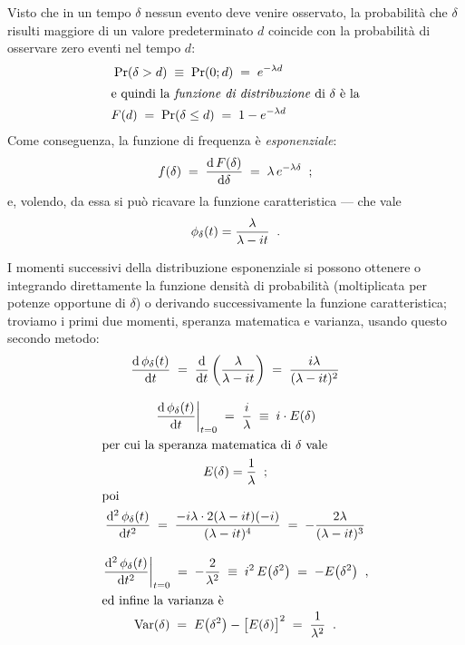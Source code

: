 Visto che in un tempo $\delta$ nessun evento deve venire
osservato, la probabilit\`a che $\delta$ risulti maggiore di
un valore predeterminato $d$ coincide con la probabilit\`a
di osservare zero eventi nel tempo $d$:
\begin{gather*}
  \Pr (\delta > d) \; \equiv \; \Pr (0;d) \; = \; e^{-
    \lambda d} \\
  \intertext{e quindi la \emph{funzione di distribuzione} di
    $\delta$ \`e la}
  F(d) \; = \; \Pr (\delta \le d) \; = \; 1 - e^{- \lambda
    d}
\end{gather*}
Come conseguenza, la funzione di frequenza \`e
\emph{esponenziale}:
\begin{equation} \label{eq:8.expon}
  f(\delta) \; = \; \frac{\mathrm{d} \, F(\delta)}{\mathrm{d} \delta} \; =
  \; \lambda \, e^{- \lambda \delta} \;\; ;
\end{equation}
e, volendo, da essa si pu\`o ricavare la funzione
caratteristica --- che vale
\begin{equation*}
  \phi_\delta (t) = \frac{\lambda}{\lambda - i t} \;\; .
\end{equation*}

I momenti successivi della distribuzione esponenziale si
possono ottenere o integrando direttamente la funzione
densit\`a di probabilit\`a (moltiplicata per potenze
opportune di $\delta$) o derivando successivamente la
funzione caratteristica; troviamo i primi due momenti,
speranza matematica e varianza, usando questo secondo
metodo:
\begin{gather*}
  \frac{\mathrm{d} \, \phi_\delta (t)}{\mathrm{d} t} \; = \;
  \frac{\mathrm{d}}{\mathrm{d} t} \left( \frac{ \lambda }{ \lambda - i t
      } \right) \; = \; \frac{ i \lambda }{ (\lambda - i
    t)^2 } \\[2ex]
  \left. \frac{\mathrm{d} \, \phi_\delta (t)}{\mathrm{d} t} \right|_{t=0}
  \; = \; \frac{i}{\lambda} \; \equiv \; i \cdot E(\delta)
  \\
  \intertext{per cui la speranza matematica di $\delta$
    vale}
  E(\delta) = \frac{1}{\lambda} \;\; ; \\
  \intertext{poi}
  \frac {\mathrm{d}^2 \, \phi_\delta (t)}{\mathrm{d} t^2} \; = \; \frac{-i
    \lambda \cdot 2 (\lambda - it)(- i)}{(\lambda - it)^4}
  \; = \; - \frac{2 \lambda}{(\lambda - it)^3} \\[2ex]
  \left. \frac {\mathrm{d}^2 \, \phi_\delta (t)}{\mathrm{d} t^2}
  \right|_{t=0} \; = \; - \frac{2}{\lambda^2} \; \equiv \;
  i^2 \, E \bigl( \delta^2 \bigr) \; = \; - E \bigl(
  \delta^2 \bigr) \;\; , \\
  \intertext{ed infine la varianza \`e}
  \operatorname{Var} (\delta) \; = \; E \bigl( \delta^2 \bigr) - \bigl[
  E(\delta) \bigr]^2 \; = \; \frac{1}{\lambda^2} \;\; .
\end{gather*}

